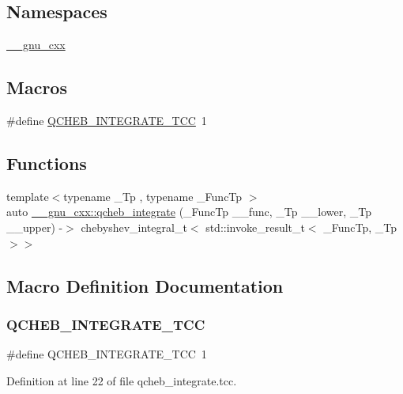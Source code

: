 \subsection*{Namespaces}
\begin{DoxyCompactItemize}
\item 
 \hyperlink{namespace____gnu__cxx}{\+\_\+\+\_\+gnu\+\_\+cxx}
\end{DoxyCompactItemize}
\subsection*{Macros}
\begin{DoxyCompactItemize}
\item 
\#define \hyperlink{qcheb__integrate_8tcc_a67b8160af7def53dc3dc6c13f7ec36ca}{Q\+C\+H\+E\+B\+\_\+\+I\+N\+T\+E\+G\+R\+A\+T\+E\+\_\+\+T\+CC}~1
\end{DoxyCompactItemize}
\subsection*{Functions}
\begin{DoxyCompactItemize}
\item 
{\footnotesize template$<$typename \+\_\+\+Tp , typename \+\_\+\+Func\+Tp $>$ }\\auto \hyperlink{namespace____gnu__cxx_aa8e32fefb92558e0c8ddb94c25fd637b}{\+\_\+\+\_\+gnu\+\_\+cxx\+::qcheb\+\_\+integrate} (\+\_\+\+Func\+Tp \+\_\+\+\_\+func, \+\_\+\+Tp \+\_\+\+\_\+lower, \+\_\+\+Tp \+\_\+\+\_\+upper) -\/$>$ chebyshev\+\_\+integral\+\_\+t$<$ std\+::invoke\+\_\+result\+\_\+t$<$ \+\_\+\+Func\+Tp, \+\_\+\+Tp $>$$>$
\end{DoxyCompactItemize}


\subsection{Macro Definition Documentation}
\mbox{\label{qcheb__integrate_8tcc_a67b8160af7def53dc3dc6c13f7ec36ca}} 
\subsubsection{\texorpdfstring{Q\+C\+H\+E\+B\+\_\+\+I\+N\+T\+E\+G\+R\+A\+T\+E\+\_\+\+T\+CC}{QCHEB\_INTEGRATE\_TCC}}
{\footnotesize\ttfamily \#define Q\+C\+H\+E\+B\+\_\+\+I\+N\+T\+E\+G\+R\+A\+T\+E\+\_\+\+T\+CC~1}



Definition at line 22 of file qcheb\+\_\+integrate.\+tcc.

